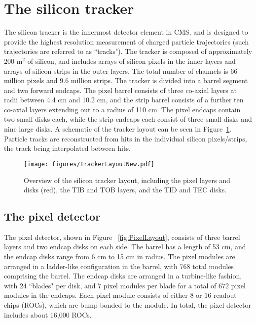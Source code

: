 \section{The silicon tracker}

The silicon tracker is the innermost detector element in CMS, and is designed to provide the highest resolution measurement of charged particle trajectories (such trajectories are referred to as ``tracks"). The tracker is composed of approximately 200 m$^{2}$ of silicon, and includes arrays of silicon pixels in the inner layers and arrays of silicon strips in the outer layers. The total number of channels is 66 million pixels and 9.6 million strips.\cite{TDR} The tracker is divided into a barrel segment and two forward endcaps. The pixel barrel consists of three co-axial layers at radii between 4.4 cm and 10.2 cm, and the strip barrel consists of a further ten co-axial layers extending out to a radius of 110 cm. The pixel endcaps contain two small disks each, while the strip endcaps each consist of three small disks and nine large disks. A schematic of the tracker layout can be seen in Figure~\ref{fig:TrackerLayout}. Particle tracks are reconstructed from hits in the individual silicon pixels/strips, the track being interpolated between hits.

\begin{figure}\centering
  \texttt{[image: figures/TrackerLayoutNew.pdf]}
  \caption{\label{fig:TrackerLayout} Overview of the silicon tracker layout, including the pixel layers and disks (red), the TIB and TOB layers, and the TID and TEC disks.}
\end{figure}


\subsection{The pixel detector}

The pixel detector, shown in Figure ~\ref{fig:PixelLayout}, consists of three barrel layers and two endcap disks on each side. The barrel has a length of 53 cm, and the endcap disks range from 6 cm to 15 cm in radius. The pixel modules are arranged in a ladder-like configuration in the barrel, with 768 total modules comprising the barrel. The endcap disks are arranged in a turbine-like fashion, with 24 ``blades" per disk, and 7 pixel modules per blade for a total of 672 pixel modules in the endcaps.
Each pixel module consists of either 8 or 16 readout chips (ROCs), which are bump bonded to the module. In total, the pixel detector includes about 16,000 ROCs.\cite{Pixel}

